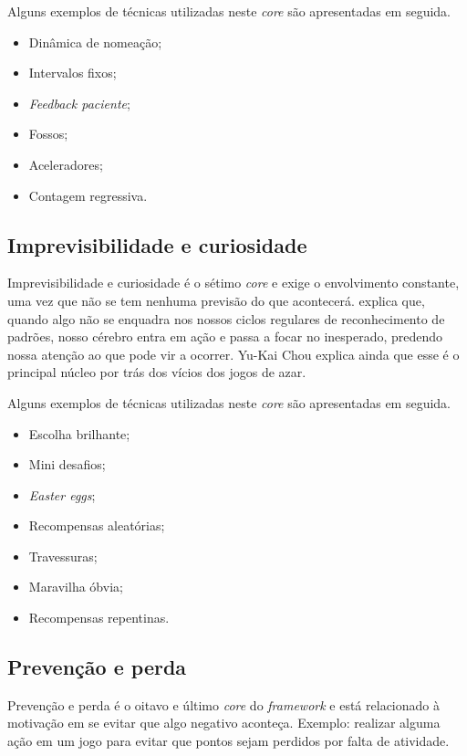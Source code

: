 Alguns exemplos de técnicas utilizadas neste \textit{core} são apresentadas em seguida.

\begin{itemize}
	\item Dinâmica de nomeação;
	\item Intervalos fixos;
	\item \textit{Feedback paciente};
	\item Fossos;
	\item Aceleradores;
	\item Contagem regressiva.
\end{itemize}


\subsection{Imprevisibilidade e curiosidade}
Imprevisibilidade e curiosidade é o sétimo \textit{core} e exige o envolvimento constante, uma vez que não se tem nenhuma previsão
do que acontecerá.  explica que, quando algo não se enquadra nos nossos ciclos regulares de reconhecimento
de padrões, nosso cérebro entra em ação e passa a focar no inesperado, predendo nossa atenção ao que pode vir a ocorrer. Yu-Kai Chou explica
ainda que esse é o principal núcleo por trás dos vícios dos jogos de azar.

Alguns exemplos de técnicas utilizadas neste \textit{core} são apresentadas em seguida.

\begin{itemize}
	\item Escolha brilhante;
	\item Mini desafios;
	\item \textit{Easter eggs};
	\item Recompensas aleatórias;
	\item Travessuras;
	\item Maravilha óbvia;
	\item Recompensas repentinas.
\end{itemize}



\subsection{Prevenção e perda}
Prevenção e perda é o oitavo e último \textit{core} do \textit{framework} e está relacionado à motivação em se evitar que algo negativo
aconteça. Exemplo: realizar alguma ação em um jogo para evitar que pontos sejam perdidos por falta de atividade.

